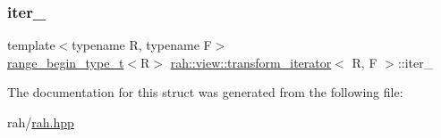 \subsubsection{\texorpdfstring{iter\_}{iter\_}}
{\footnotesize\ttfamily template$<$typename R, typename F$>$ \\
\mbox{\hyperlink{namespacerah_a28aff4eeddcece6be65ff0b956d32d4a}{range\+\_\+begin\+\_\+type\+\_\+t}}$<$R$>$ \mbox{\hyperlink{structrah_1_1view_1_1transform__iterator}{rah\+::view\+::transform\+\_\+iterator}}$<$ R, F $>$\+::iter\+\_\+}



The documentation for this struct was generated from the following file\+:\begin{DoxyCompactItemize}
\item 
rah/\mbox{\hyperlink{rah_8hpp}{rah.\+hpp}}\end{DoxyCompactItemize}
